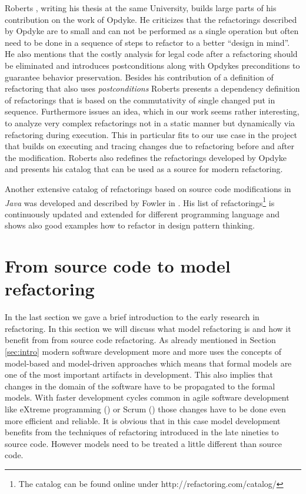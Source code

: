 \documentclass{llncs}
\begin{document}
Roberts \cite{rob99}, writing his thesis at the same University, builds large parts of his contribution on the work of Opdyke. He criticizes that the refactorings described by Opdyke are to small and can not be performed as a single operation but often need to be done in a sequence of steps to refactor to a better ``design in mind''.  He also mentions that the costly analysis for legal code after a refactoring should be eliminated and introduces postconditions along with Opdykes preconditions to guarantee behavior preservation. Besides his contribution of a definition of refactoring that also uses \textit{postconditions} Roberts presents a dependency definition of refactorings that is based on the commutativity of single changed put in sequence. Furthermore issues an idea, which in our work seems rather interesting, to analyze very complex refactorings not in a static manner but dynamically via refactoring during execution. This in particular fits to our use case in the project that builds on executing and tracing changes due to refactoring before and after the modification. Roberts also redefines the refactorings developed by Opdyke and presents his catalog that can be used as a source for modern refactoring. 

Another extensive catalog of refactorings based on source code modifications in \textit{Java} was developed and described by Fowler in \cite{fow99}. His list of refactorings\footnote{The catalog can be found online under http://refactoring.com/catalog/} is continuously updated and extended for different programming language and shows also good examples how to refactor in design pattern thinking.

\section{From source code to model refactoring}
\label{sec:fromto}

In the last section we gave a brief introduction to the early research in refactoring. In this section we will discuss what model refactoring is and how it benefit from from source code refactoring. As already mentioned in Section \ref{sec:intro} modern software development more and more uses the concepts of model-based and model-driven approaches which means that formal models are one of the most important artifacts in development. This also implies that changes in the domain of the software have to be propagated to the formal models. With faster development cycles common in agile software development like eXtreme programming (\cite{DBLP:journals/computer/Beck99}) or Scrum (\cite{DBLP:journals/software/RisingJ00}) those changes have to be done even more efficient and reliable. It is obvious that in this case model development benefits from the techniques of refactoring introduced in the late nineties to source code. However models need to be treated a little different than source code.
\end{document}
